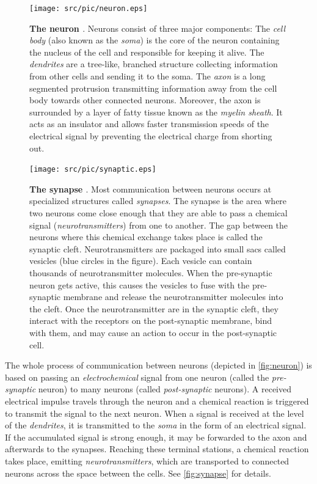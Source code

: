 \begin{figure}[ht!]
  \centering
  \texttt{[image: src/pic/neuron.eps]}
  \caption{\textbf{The neuron \cite[taken from][]{introductiontopsychology}}. Neurons consist of three major components: The \emph{cell body} (also known as the \emph{soma}) is the core of the neuron containing the nucleus of the cell and responsible for keeping it alive. The \emph{dendrites} are a tree-like, branched structure collecting information from other cells and sending it to the soma. The \emph{axon} is a long segmented protrusion transmitting information away from the cell body towards other connected neurons. Moreover, the axon is surrounded by a layer of fatty tissue known as the \emph{myelin sheath}. It acts as an insulator and allows faster transmission speeds of the electrical signal by preventing the electrical charge from shorting out.}
  \label{fig:neuron}
\end{figure}

\begin{figure}[ht!]
  \centering
  \texttt{[image: src/pic/synaptic.eps]}
  \caption{\textbf{The synapse \citep[taken from][]{introductiontopsychology}}. Most communication between neurons occurs at specialized structures called \emph{synapses}. The synapse is the area where two neurons come close enough that they are able to pass a chemical signal (\emph{neurotransmitters}) from one to another. The gap between the neurons where this chemical exchange takes place is called the synaptic cleft. Neurotransmitters are packaged into small sacs called vesicles (blue circles in the figure). Each vesicle can contain thousands of neurotransmitter molecules. When the pre-synaptic neuron gets active, this causes the vesicles to fuse with the pre-synaptic membrane and release the neurotransmitter molecules into the cleft. Once the neurotransmitter are in the synaptic cleft, they interact with the receptors on the post-synaptic membrane, bind with them, and may cause an action to occur in the post-synaptic cell.}
  \label{fig:synapse}
\end{figure}

The whole process of communication between neurons (depicted in \autoref{fig:neuron}) is based on passing an \emph{electrochemical} signal from one neuron (called the \emph{pre-synaptic} neuron) to many neurons (called \emph{post-synaptic} neurons). A received electrical impulse travels through the neuron and a chemical reaction is triggered to transmit the signal to the next neuron. When a signal is received at the level of the \emph{dendrites}, it is transmitted to the \emph{soma} in the form of an electrical signal. If the accumulated signal is strong enough, it may be forwarded to the axon and afterwards to the synapses. Reaching these terminal stations, a chemical reaction takes place, emitting \emph{neurotransmitters}, which are transported to connected neurons across the space between the cells. See \autoref{fig:synapse} for details.

